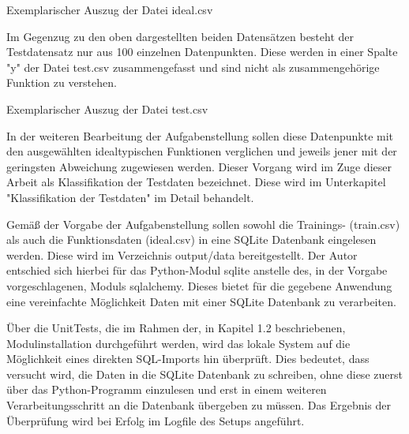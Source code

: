 \begin{table}[H]
\small
\centering
{}
\caption{Exemplarischer Auszug der Datei ideal.csv}
\label{tab:Exemplarischer Auszug aus ideal.csv}
\end{table} 

Im Gegenzug zu den oben dargestellten beiden Datensätzen besteht der Testdatensatz nur aus 100 einzelnen Datenpunkten. Diese werden in einer Spalte "y" der Datei test.csv zusammengefasst und sind nicht als zusammengehörige Funktion zu verstehen. 

\begin{table}[H]
\small
\centering
{}
\caption{Exemplarischer Auszug der Datei test.csv}
\label{tab:Exemplarischer Auszug aus test.csv}
\end{table} 

In der weiteren Bearbeitung der Aufgabenstellung sollen diese Datenpunkte mit den ausgewählten idealtypischen Funktionen verglichen und jeweils jener mit der geringsten Abweichung zugewiesen werden. Dieser Vorgang wird im Zuge dieser Arbeit als Klassifikation der Testdaten bezeichnet. Diese wird im Unterkapitel "Klassifikation der Testdaten" im Detail behandelt.

Gemäß der Vorgabe der Aufgabenstellung sollen sowohl die Trainings- (train.csv) als auch die Funktionsdaten (ideal.csv) in eine SQLite Datenbank eingelesen werden. Diese wird im Verzeichnis output/data bereitgestellt. Der Autor entschied sich hierbei für das Python-Modul sqlite anstelle des, in der Vorgabe vorgeschlagenen, Moduls sqlalchemy. Dieses bietet für die gegebene Anwendung eine vereinfachte Möglichkeit Daten mit einer SQLite Datenbank zu verarbeiten.

Über die UnitTests, die im Rahmen der, in Kapitel 1.2 beschriebenen, Modulinstallation durchgeführt werden, wird das lokale System auf die Möglichkeit eines direkten SQL-Imports hin überprüft. Dies bedeutet, dass versucht wird, die Daten in die SQLite Datenbank zu schreiben, ohne diese zuerst über das Python-Programm einzulesen und erst in einem weiteren Verarbeitungsschritt an die Datenbank übergeben zu müssen. Das Ergebnis der Überprüfung wird bei Erfolg im Logfile des Setups angeführt. 

